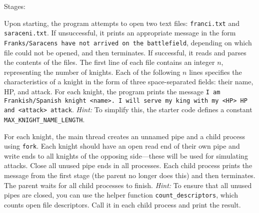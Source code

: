 \documentclass[addpoints,a4paper]{exam}
\begin{document}
Stages:\nopagebreak[4]
\begin{questions}
  \question[5] Upon starting, the program attempts to open two text files: \texttt{franci.txt} and \texttt{saraceni.txt}. If unsuccessful, it prints an appropriate message in the form \texttt{Franks/Saracens have not arrived on the battlefield}, depending on which file could not be opened, and then terminates. If successful, it reads and parses the contents of the files. The first line of each file contains an integer $n$, representing the number of knights. Each of the following $n$ lines specifies the characteristics of a knight in the form of three space-separated fields: their name, HP, and attack. For each knight, the program prints the message \texttt{I am Frankish/Spanish knight <name>. I will serve my king with my <HP> HP and <attack> attack}.  
  \textit{Hint:} To simplify this, the starter code defines a constant \texttt{MAX\_KNIGHT\_NAME\_LENGTH}.
  
  \question[7] For each knight, the main thread creates an unnamed pipe and a child process using \texttt{fork}. Each knight should have an open read end of their own pipe and write ends to all knights of the opposing side—these will be used for simulating attacks. Close all unused pipe ends in all processes. Each child process prints the message from the first stage (the parent no longer does this) and then terminates. The parent waits for all child processes to finish.  
  \textit{Hint:} To ensure that all unused pipes are closed, you can use the helper function \texttt{count\_descriptors}, which counts open file descriptors. Call it in each child process and print the result.


\end{questions}
\end{document}
